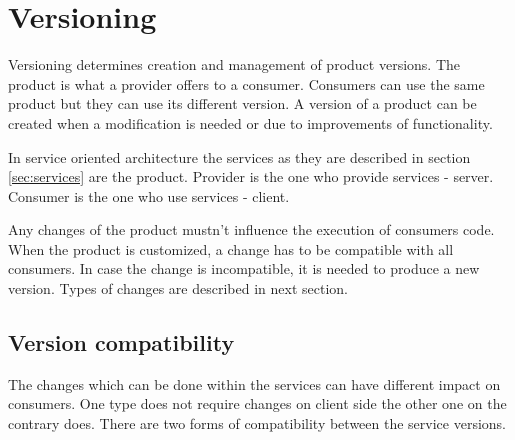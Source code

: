\chapter{Versioning}
\label{chap:versioning}

Versioning determines creation and management of product versions. The product is what a provider offers to a consumer. Consumers can use the same product but they can use its different version. A version of a product can be created when a modification is needed or due to improvements of functionality.

In service oriented architecture the services as they are described in section \ref{sec:services} are the product. Provider is the one who provide services - server. Consumer is the one who use services - client.

Any changes of the product mustn't influence the execution of consumers code.
When the product is customized, a change has to be compatible with all consumers. In case the change is incompatible, it is needed to produce a new version. Types of changes are described in next section.


\section{Version compatibility}
\label{sec:v-compat}
The changes which can be done within the services can have different impact on consumers. One type does not require changes on client side the other one on the contrary does. There are two forms of compatibility between the service versions. \cite{website:service-versioning}

